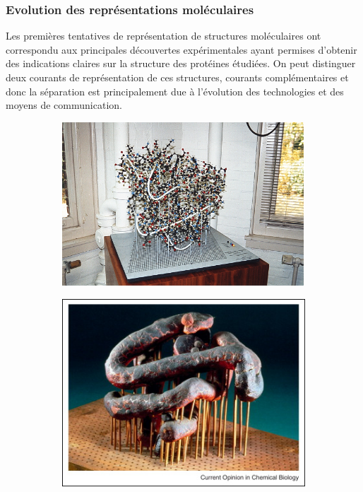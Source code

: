 \subsubsection{Evolution des représentations moléculaires}

Les premières tentatives de représentation de structures moléculaires ont correspondu aux principales découvertes expérimentales ayant permises d'obtenir des indications claires sur la structure des protéines étudiées. On peut distinguer deux courants de représentation de ces structures, courants complémentaires et donc la séparation est principalement due à l'évolution des technologies et des moyens de communication.

\begin{figure}
  \begin{subfigure}{.5\textwidth}
  \centering
  {\includegraphics[width=0.9\linewidth]{./figures/ch1/kendrew_myoglobin_ball_and_spokes}}
  \caption{}
    \label{Fig:kendrew_myoglobin_ball_and_spokes}
  \end{subfigure}%
  \begin{subfigure}{.5\textwidth}
  \centering
  {\includegraphics[width=0.9\linewidth]{./figures/ch1/kendrew_myoglobin_plasticine}}

\end{subfigure}
\end{figure}
